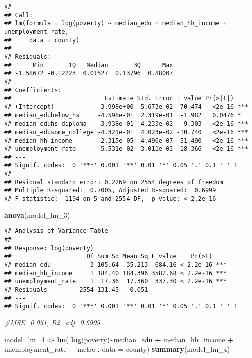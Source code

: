 \documentclass[
]{article}
\newenvironment{Shaded}{\begin{snugshade}}{\end{snugshade}}
\newcommand{\AttributeTok}[1]{\textcolor[rgb]{0.13,0.29,0.53}{#1}}
\newcommand{\CommentTok}[1]{\textcolor[rgb]{0.56,0.35,0.01}{\textit{#1}}}
\newcommand{\FunctionTok}[1]{\textcolor[rgb]{0.13,0.29,0.53}{\textbf{#1}}}
\newcommand{\NormalTok}[1]{#1}
\newcommand{\OtherTok}[1]{\textcolor[rgb]{0.56,0.35,0.01}{#1}}
\newcommand{\SpecialCharTok}[1]{\textcolor[rgb]{0.81,0.36,0.00}{\textbf{#1}}}
\begin{document}
\begin{verbatim}
## 
## Call:
## lm(formula = log(poverty) ~ median_edu + median_hh_income + unemployment_rate, 
##     data = county)
## 
## Residuals:
##      Min       1Q   Median       3Q      Max 
## -1.58672 -0.12223  0.01527  0.13796  0.88007 
## 
## Coefficients:
##                          Estimate Std. Error t value Pr(>|t|)    
## (Intercept)             3.998e+00  5.673e-02  70.474   <2e-16 ***
## median_edubelow_hs     -4.598e-01  2.319e-01  -1.982   0.0476 *  
## median_eduhs_diploma   -3.938e-01  4.233e-02  -9.303   <2e-16 ***
## median_edusome_college -4.321e-01  4.023e-02 -10.740   <2e-16 ***
## median_hh_income       -2.315e-05  4.496e-07 -51.490   <2e-16 ***
## unemployment_rate       5.531e-02  3.011e-03  18.366   <2e-16 ***
## ---
## Signif. codes:  0 '***' 0.001 '**' 0.01 '*' 0.05 '.' 0.1 ' ' 1
## 
## Residual standard error: 0.2269 on 2554 degrees of freedom
## Multiple R-squared:  0.7005, Adjusted R-squared:  0.6999 
## F-statistic:  1194 on 5 and 2554 DF,  p-value: < 2.2e-16
\end{verbatim}

\begin{Shaded}
\begin{Highlighting}[]
\FunctionTok{anova}\NormalTok{(model\_lm\_3)}
\end{Highlighting}
\end{Shaded}

\begin{verbatim}
## Analysis of Variance Table
## 
## Response: log(poverty)
##                     Df Sum Sq Mean Sq F value    Pr(>F)    
## median_edu           3 105.64  35.213  684.16 < 2.2e-16 ***
## median_hh_income     1 184.40 184.396 3582.68 < 2.2e-16 ***
## unemployment_rate    1  17.36  17.360  337.30 < 2.2e-16 ***
## Residuals         2554 131.45   0.051                      
## ---
## Signif. codes:  0 '***' 0.001 '**' 0.01 '*' 0.05 '.' 0.1 ' ' 1
\end{verbatim}

\begin{Shaded}
\begin{Highlighting}[]
\CommentTok{\#MSE=0.051, R2\_adj=0.6999}

\NormalTok{model\_lm\_4 }\OtherTok{\textless{}{-}} \FunctionTok{lm}\NormalTok{( }\FunctionTok{log}\NormalTok{(poverty)}\SpecialCharTok{\textasciitilde{}}\NormalTok{median\_edu }\SpecialCharTok{+}\NormalTok{ median\_hh\_income }\SpecialCharTok{+}\NormalTok{ unemployment\_rate }\SpecialCharTok{+}\NormalTok{ metro , }\AttributeTok{data =}\NormalTok{ county)}
\FunctionTok{summary}\NormalTok{(model\_lm\_4)}
\end{Highlighting}
\end{Shaded}
\end{document}
